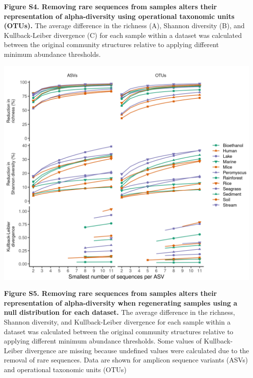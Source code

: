 \documentclass[
]{article}
\begin{document}
\textbf{Figure S4. Removing rare sequences from samples alters their
representation of alpha-diversity using operational taxonomic units
(OTUs).} The average difference in the richness (A), Shannon diversity
(B), and Kullback-Leiber divergence (C) for each sample within a dataset
was calculated between the original community structures relative to
applying different minimum abundance thresholds.

\newpage

\includegraphics{figure_s5.png}

\textbf{Figure S5. Removing rare sequences from samples alters their
representation of alpha-diversity when regenerating samples using a null
distribution for each dataset.} The average difference in the richness,
Shannon diversity, and Kullback-Leiber divergence for each sample within
a dataset was calculated between the original community structures
relative to applying different minimum abundance thresholds. Some values
of Kullback-Leiber divergence are missing because undefined values were
calculated due to the removal of rare sequences. Data are shown for
amplicon sequence variants (ASVs) and operational taxonomic units (OTUs)

\newpage
\end{document}
